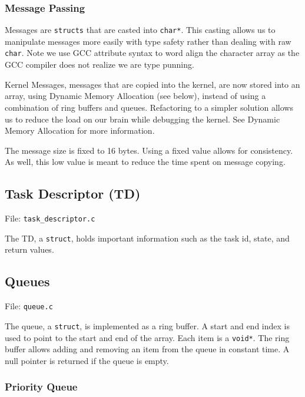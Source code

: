 \documentclass[letterpaper]{article}
\begin{document}
\subsubsection{Message Passing%
  \label{message-passing}%
}

Messages are \texttt{structs} that are casted into \texttt{char*}. This casting allows us to manipulate messages more easily with type safety rather than dealing with raw \texttt{char}. Note we use GCC attribute syntax to word align the character array as the GCC compiler does not realize we are type punning.

Kernel Messages, messages that are copied into the kernel, are now stored into an array, using Dynamic Memory Allocation (see below), instead of using a combination of ring buffers and queues. Refactoring to a simpler solution allows us to reduce the load on our brain while debugging the kernel. See Dynamic Memory Allocation for more information.

The message size is fixed to 16 bytes. Using a fixed value allows for consistency. As well, this low value is meant to reduce the time spent on message copying.


\subsection{Task Descriptor (TD)%
  \label{task-descriptor-td}%
}

File: \texttt{task\_descriptor.c}

The TD, a \texttt{struct}, holds important information such as the task id, state, and return values.


\subsection{Queues%
  \label{queues}%
}

File: \texttt{queue.c}

The queue, a \texttt{struct}, is implemented as a ring buffer. A start and end index is used to point to the start and end of the array. Each item is a \texttt{void*}. The ring buffer allows adding and removing an item from the queue in constant time. A null pointer is returned if the queue is empty.


\subsubsection{Priority Queue%
  \label{priority-queue}%
}
\end{document}
